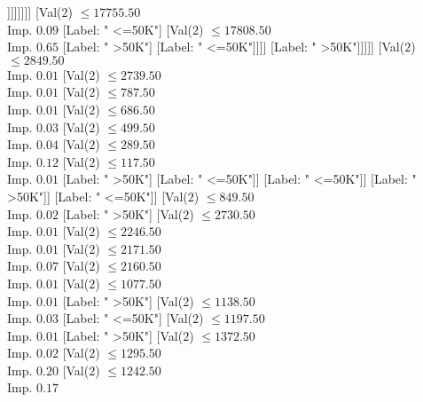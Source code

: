 \documentclass[margin=10pt]{standalone}
\begin{document}
\begin{forest}
																						[Val($2$) $ \leq 17353.50$ \\ Imp. $0.92$
																							[Label: " <=50K"]
																							[Label: " >50K"]]]]]]]]
																[Val($2$) $ \leq 17755.50$ \\ Imp. $0.09$
																	[Label: " <=50K"]
																	[Val($2$) $ \leq 17808.50$ \\ Imp. $0.65$
																		[Label: " >50K"]
																		[Label: " <=50K"]]]]
															[Label: " >50K"]]]]]
											[Val($2$) $ \leq 2849.50$ \\ Imp. $0.01$
												[Val($2$) $ \leq 2739.50$ \\ Imp. $0.01$
													[Val($2$) $ \leq 787.50$ \\ Imp. $0.01$
														[Val($2$) $ \leq 686.50$ \\ Imp. $0.03$
															[Val($2$) $ \leq 499.50$ \\ Imp. $0.04$
																[Val($2$) $ \leq 289.50$ \\ Imp. $0.12$
																	[Val($2$) $ \leq 117.50$ \\ Imp. $0.01$
																		[Label: " >50K"]
																		[Label: " <=50K"]]
																	[Label: " <=50K"]]
																[Label: " >50K"]]
															[Label: " <=50K"]]
														[Val($2$) $ \leq 849.50$ \\ Imp. $0.02$
															[Label: " >50K"]
															[Val($2$) $ \leq 2730.50$ \\ Imp. $0.01$
																[Val($2$) $ \leq 2246.50$ \\ Imp. $0.01$
																	[Val($2$) $ \leq 2171.50$ \\ Imp. $0.07$
																		[Val($2$) $ \leq 2160.50$ \\ Imp. $0.01$
																			[Val($2$) $ \leq 1077.50$ \\ Imp. $0.01$
																				[Label: " >50K"]
																				[Val($2$) $ \leq 1138.50$ \\ Imp. $0.03$
																					[Label: " <=50K"]
																					[Val($2$) $ \leq 1197.50$ \\ Imp. $0.01$
																						[Label: " >50K"]
																						[Val($2$) $ \leq 1372.50$ \\ Imp. $0.02$
																							[Val($2$) $ \leq 1295.50$ \\ Imp. $0.20$
																								[Val($2$) $ \leq 1242.50$ \\ Imp. $0.17$

\end{forest}
\end{document}
